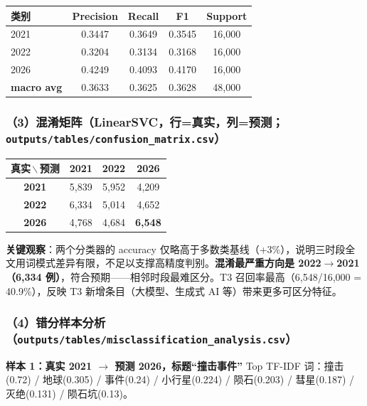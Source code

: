 \documentclass[12pt,a4paper]{article}
\begin{document}
\begin{table}[H]
\centering
\renewcommand{\arraystretch}{1.25}
\begin{tabular}{|l|c|c|c|c|}
\hline
\textbf{类别} & \textbf{Precision} & \textbf{Recall} & \textbf{F1} & \textbf{Support} \\
\hline
2021 & 0.3447 & 0.3649 & 0.3545 & 16,000 \\
\hline 2022 & 0.3204 & 0.3134 & 0.3168 & 16,000 \\
\hline 2026 & 0.4249 & 0.4093 & 0.4170 & 16,000 \\
\hline
\textbf{macro avg} & 0.3633 & 0.3625 & 0.3628 & 48,000 \\
\hline
\end{tabular}
\end{table}

\subsubsection*{（3）混淆矩阵（LinearSVC，行=真实，列=预测；\texttt{outputs/tables/confusion\_matrix.csv}）}

\begin{table}[H]
\centering
\renewcommand{\arraystretch}{1.3}
\begin{tabular}{|c|c|c|c|}
\hline
\textbf{真实\,$\backslash$\,预测} & \textbf{2021} & \textbf{2022} & \textbf{2026} \\
\hline
\textbf{2021} & 5,839 & 5,952 & 4,209 \\
\hline \textbf{2022} & 6,334 & 5,014 & 4,652 \\
\hline \textbf{2026} & 4,768 & 4,684 & \textbf{6,548} \\
\hline
\end{tabular}
\end{table}

\textbf{关键观察}：两个分类器的 accuracy 仅略高于多数类基线（+3\%），说明三时段全文用词模式差异有限，不足以支撑高精度判别。\textbf{混淆最严重方向是 2022$\rightarrow$2021（6,334 例）}，符合预期——相邻时段最难区分。T3 召回率最高（6,548/16,000 = 40.9\%），反映 T3 新增条目（大模型、生成式 AI 等）带来更多可区分特征。

\subsubsection*{（4）错分样本分析（\texttt{outputs/tables/misclassification\_analysis.csv}）}

\textbf{样本 1：真实 2021 $\rightarrow$ 预测 2026，标题“撞击事件”}
Top TF-IDF 词：撞击(0.72) / 地球(0.305) / 事件(0.24) / 小行星(0.224) / 陨石(0.203) / 彗星(0.187) / 灭绝(0.131) / 陨石坑(0.13)。
\end{document}
